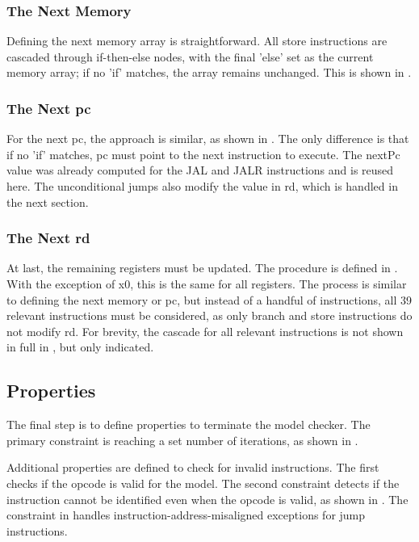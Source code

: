 

\subsubsection{The Next Memory}
Defining the next memory array is straightforward. All store
instructions are cascaded through if-then-else nodes, with the final
'else' set as the current memory array; if no 'if' matches, the array
remains unchanged. This is shown in .



\subsubsection{The Next pc}
For the next pc, the approach is similar, as shown in
. The only difference is that if no 'if' matches,
pc must point to the next instruction to execute. The nextPc value
was already computed for the JAL and JALR instructions and is reused
here. The unconditional jumps also modify the value in rd, which is
handled in the next section.



\subsubsection{The Next rd}
At last, the remaining registers must be updated. The procedure is
defined in . With the exception of x0, this is the
same for all registers. The process is similar to defining the next
memory or pc, but instead of a handful of instructions, all 39
relevant instructions must be considered, as only branch and store
instructions do not modify rd. For brevity, the cascade for all
relevant instructions is not shown in full in ,
but only indicated.



\subsection{Properties}
The final step is to define properties to terminate the model
checker. The primary constraint is reaching a set number of
iterations, as shown in .

Additional properties are defined to check for invalid instructions.
The first checks if the opcode is valid for the model. The second
constraint detects if the instruction cannot be identified even when
the opcode is valid, as shown in . The
constraint in  handles
instruction-address-misaligned exceptions for jump instructions.

